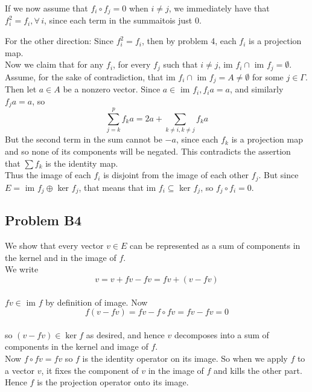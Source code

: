 \documentclass{article}
\begin{document}
If we now assume that $f_i \circ f_j = 0$ when $i \neq j$, we immediately have
that $f_i^2 = f_i, \forall\, i$, since each term in the summaitois just 0.

For the other direction: Since $f_i^2=f_i$, then by problem 4, each $f_i$ is a projection map.
\\Now we claim that for any $f_i$, for every $f_j$ such that $i\neq j$, im $f_i \cap $ im $f_j = \emptyset$. 
\\Assume, for the sake of contradiction, that im $f_i \cap $ im $f_j = A \neq \emptyset$ for some $j\in \Gamma$. 
\\Then let $a \in A$ be a nonzero vector. Since $a \in $ im $f_i,f_ia=a$, and similarly $f_ja=a$, so 
\[\displaystyle\sum_{j=k}^p f_k a=2a+\displaystyle\sum_{k\neq i,k\neq j}f_k a\]
But the second term in the sum cannot be $-a$, since each $f_k$ is a projection map and so  none of its components will be negated. This contradicts the assertion that $\displaystyle\sum f_k$ is the identity map.
\\Thus the image of each $f_i$ is disjoint from the image of each other $f_j$. But since $E=$ im $f_j \oplus $ ker $f_j$, that means that im $f_i \subseteq $ ker $f_j$, so $f_j \circ f_i = 0$. 

\subsection{Problem B4}
We show that every vector $v\in E$ can be represented as a sum of components in the kernel and in the image of $f$. 
\\We write 
\[v = v + fv - fv = fv + (v - fv)\]
\\$fv\in $ im $f$ by definition of image. Now 
\[f(v-fv)=fv-f\circ fv=fv-fv=0\]
\\so $(v-fv)\in \ker f$ as desired, and hence $v$ decomposes into a sum of components in the kernel and image of $f$. 
\\Now $f\circ fv=fv$ so $f$ is the identity operator on its image. So when we apply $f$ to a vector $v$, it fixes the component of $v$ in the image of $f$ and kills the other part. Hence $f$ is the projection operator onto its image.
\end{document}
